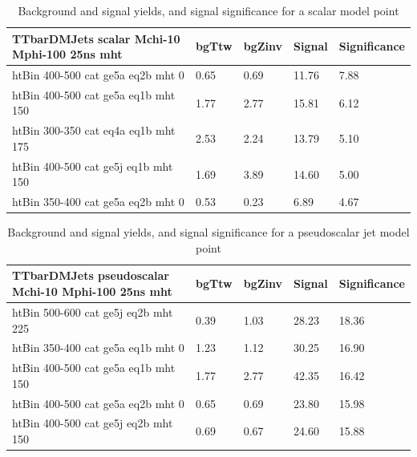 \clearpage

\begin{table}
\small
\begin{center}
\caption{Background and signal yields, and signal significance for a scalar \DMtt model point}
\label{tab:MSB_DMttS_2fb}
\begin{tabular}{|l|l|l|l|l|}
\textbf{TTbarDMJets scalar Mchi-10 Mphi-100 25ns mht}    &  bgTtw    &  bgZinv   &  Signal &     Significance \\ 
\hline
htBin 400-500 cat ge5a eq2b mht 0 &     0.65     &  0.69     &  11.76   &7.88 \\ 
htBin 400-500 cat ge5a eq1b mht 150 &   1.77     &  2.77     &  15.81   &6.12 \\ 
htBin 300-350 cat eq4a eq1b mht 175 &   2.53     &  2.24     &  13.79   &5.10 \\ 
htBin 400-500 cat ge5j eq1b mht 150 &   1.69     &  3.89     &  14.60   &5.00 \\ 
htBin 350-400 cat ge5a eq2b mht 0 &     0.53     &  0.23     &  6.89    &4.67 \\ 
\end{tabular}
\end{center}
\end{table}

\begin{table}
\small
\begin{center}
\caption{Background and signal yields, and signal significance for a pseudoscalar \DMtt jet model point}
\label{tab:MSB_DMttP_2fb}
\begin{tabular}{|l|l|l|l|l|}
\textbf{TTbarDMJets pseudoscalar Mchi-10 Mphi-100 25ns mht}  &  bgTtw    &  bgZinv   &  Signal &     Significance \\ 
\hline
htBin 500-600 cat ge5j eq2b mht 225 &   0.39     &  1.03     &  28.23   &18.36 \\ 
htBin 350-400 cat ge5a eq1b mht 0 &     1.23     &  1.12     &  30.25   &16.90 \\ 
htBin 400-500 cat ge5a eq1b mht 150 &   1.77     &  2.77     &  42.35   &16.42 \\ 
htBin 400-500 cat ge5a eq2b mht 0 &     0.65     &  0.69     &  23.80   &15.98 \\ 
htBin 400-500 cat ge5j eq2b mht 150 &   0.69     &  0.67     &  24.60   &15.88 \\ 
\end{tabular}
\end{center}
\end{table}


